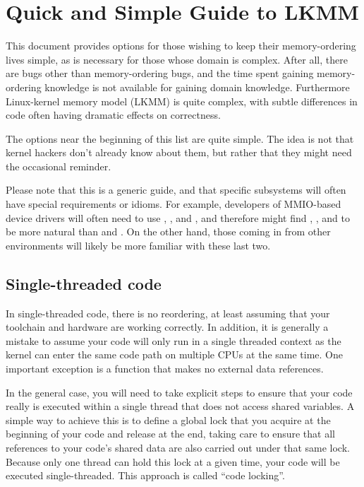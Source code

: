 \chapter{Quick and Simple Guide to LKMM}

This document provides options for those wishing to keep their
memory-ordering lives simple, as is necessary for those whose domain
is complex.
After all, there are bugs other than memory-ordering bugs,
and the time spent gaining memory-ordering knowledge is not available
for gaining domain knowledge.
Furthermore Linux-kernel memory model (LKMM) is quite complex, with
subtle differences in code often having dramatic effects on correctness.

The options near the beginning of this list are quite simple.
The idea is not that kernel hackers don't already know about them,
but rather that they might need the occasional reminder.

Please note that this is a generic guide, and that specific subsystems
will often have special requirements or idioms.
For example, developers of MMIO-based device drivers will often need
to use , , and , and therefore might find
, , and 
to be more natural than  and .
On the other hand, those coming in from other environments will likely
be more familiar with these last two.


\section{Single-threaded code}

In single-threaded code, there is no reordering, at least assuming
that your toolchain and hardware are working correctly.
In addition, it is generally a mistake to assume your code will only
run in a single threaded context as the kernel can enter the same code
path on multiple CPUs at the same time.
One important exception is a function that makes no external data references.

In the general case, you will need to take explicit steps to ensure that
your code really is executed within a single thread that does not access
shared variables.
A simple way to achieve this is to define a global lock that you acquire
at the beginning of your code and release at the end, taking care to
ensure that all references to your code's shared data are also carried
out under that same lock.
Because only one thread can hold this lock at a given time, your code
will be executed single-threaded.
This approach is called ``code locking''.

